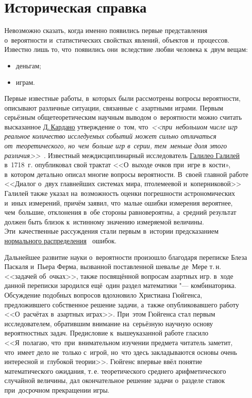 \documentclass[]{scrartcl}
\begin{document}
\section{Историческая справка}
Невозможно сказать, когда именно появились первые представления о~вероятности и~статистических свойствах явлений, объектов и~процессов. Известно лишь то, что~появились они~вследствие любви человека к~двум вещам:
\begin{itemize}
	\item деньгам;
	\item играм.
\end{itemize}
Первые известные работы, в~которых были рассмотрены вопросы вероятности, описывают различные ситуации, связанные с~азартными играми. Первым серьёзным общетеоретическим научным выводом о~вероятности можно считать высказанное \href{https://ru.wikipedia.org/wiki/Кардано,_Джероламо}{Д.\,Кардано} утверждение о~том, что~\textit{<<при~небольшом числе игр реальное количество исследуемых событий может  сильно отличаться от~теоретического, но~чем~больше игр в~серии, тем~меньше доля этого различия>>}~\cite{Wiki:Kardano-Dzherolamo}. Известный междисциплинарный исследователь \href{https://ru.wikipedia.org/wiki/Галилей,_Галилео}{Галилео Галилей} в~1718~г. опубликовал свой трактат <<О~выходе очков при~игре в~кости», в~котором детально описал многие вопросы вероятности. В~своей главной работе <<Диалог о~двух главнейших системах мира, птолемеевой и~коперниковой>> Галилей также указал на~возможность оценки погрешности астрономических и~иных измерений, причём заявил, что~малые ошибки измерения вероятнее, чем~большие, отклонения в~обе стороны равновероятны, а~средний результат должен быть близок к~истинному значению измеряемой величины. Эти~качественные рассуждения стали первым в~истории предсказанием \href{http://www.machinelearning.ru/wiki/index.php?title=Нормальное_распределение}{нормального распределения}~\cite{Distrib:Normal} ошибок. 

Дальнейшее развитие науки о~вероятности произошло благодаря переписке Блеза Паскаля и~Пьера Ферма, вызванной поставленной шевалье де~Мере т.\,н. <<задачей об~очках>>, также посвящённой вопросам азартных игр. в~ходе данной переписки зародился ещё~один раздел математики "--- комбинаторика. Обсуждение подобных вопросов вдохновило Христиана Гюйгенса, предложившего собственное решение задачи, а~также опубликовавшего работу <<О~расчётах в~азартных играх>>. При~этом Гюйгенса стал первым исследователем, обратившим внимание на~серьёзную научную основу вероятностных задач. Предисловие к~вышеуказанной работе гласило <<Я~полагаю, что~при~внимательном изучении предмета читатель заметит, что~имеет дело не~только с~игрой, но~что здесь закладываются основы очень интересной и~глубокой теории>>. Гюйгенс впервые ввёл понятие математического ожидания, т.\,е. теоретического среднего арифметического случайной величины, дал окончательное решение задачи о~разделе ставок при~досрочном прекращении игры.
\end{document}
